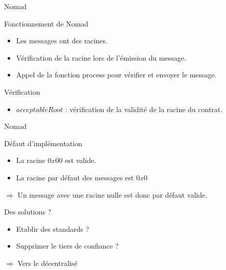 \begin{frame}{Nomad}
    \begin{block}{Fonctionnement de Nomad}
        \begin{itemize}
            \item Les messages ont des racines.
            \item Vérification de la racine lors de l'émission du message.
            \item Appel de la fonction process pour vérifier et envoyer le message.
        \end{itemize}
    \end{block}
    \pause
    \begin{block}{Vérification}
        \begin{itemize}
            \item $acceptableRoot$ : vérification de la validité de la racine du contrat.
        \end{itemize}
    \end{block}
\end{frame}

\begin{frame}{Nomad}
    \begin{block}{Défaut d'implémentation}
        \begin{itemize}
            \item La racine $0x00$ est valide.
            \item La racine par défaut des messages est $0x0$
        \end{itemize}
        $\Rightarrow$ Un message avec une racine nulle est donc par défaut valide.
    \end{block}
\end{frame}

\begin{frame}{Des solutions ?}
    \begin{itemize}
        \item Etablir des standards ?
        \item Supprimer le tiers de confiance ?
    \end{itemize}
    $\Rightarrow$ Vers le décentralisé
\end{frame}
